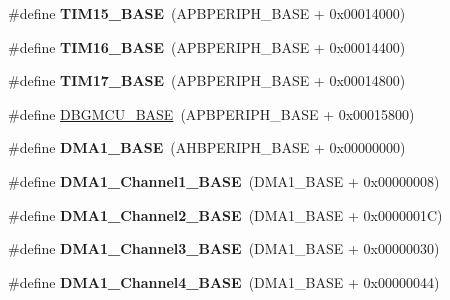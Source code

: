 \begin{DoxyCompactItemize}
\#define {\bfseries T\+I\+M15\+\_\+\+B\+A\+SE}~(A\+P\+B\+P\+E\+R\+I\+P\+H\+\_\+\+B\+A\+SE + 0x00014000)
\item 
\mbox{\label{group___peripheral__memory__map_ga16c97093a531d763b0794c3e6d09e1bf}} 
\#define {\bfseries T\+I\+M16\+\_\+\+B\+A\+SE}~(A\+P\+B\+P\+E\+R\+I\+P\+H\+\_\+\+B\+A\+SE + 0x00014400)
\item 
\mbox{\label{group___peripheral__memory__map_gaffbedbe30e8c4cffdea326d6c1800574}} 
\#define {\bfseries T\+I\+M17\+\_\+\+B\+A\+SE}~(A\+P\+B\+P\+E\+R\+I\+P\+H\+\_\+\+B\+A\+SE + 0x00014800)
\item 
\#define \hyperlink{group___peripheral__memory__map_ga4adaf4fd82ccc3a538f1f27a70cdbbef}{D\+B\+G\+M\+C\+U\+\_\+\+B\+A\+SE}~(A\+P\+B\+P\+E\+R\+I\+P\+H\+\_\+\+B\+A\+SE + 0x00015800)
\item 
\mbox{\label{group___peripheral__memory__map_gab2d8a917a0e4ea99a22ac6ebf279bc72}} 
\#define {\bfseries D\+M\+A1\+\_\+\+B\+A\+SE}~(A\+H\+B\+P\+E\+R\+I\+P\+H\+\_\+\+B\+A\+SE + 0x00000000)
\item 
\mbox{\label{group___peripheral__memory__map_ga888dbc1608243badeb3554ffedc7364c}} 
\#define {\bfseries D\+M\+A1\+\_\+\+Channel1\+\_\+\+B\+A\+SE}~(D\+M\+A1\+\_\+\+B\+A\+SE + 0x00000008)
\item 
\mbox{\label{group___peripheral__memory__map_ga38a70090eef3687e83fa6ac0c6d22267}} 
\#define {\bfseries D\+M\+A1\+\_\+\+Channel2\+\_\+\+B\+A\+SE}~(D\+M\+A1\+\_\+\+B\+A\+SE + 0x0000001\+C)
\item 
\mbox{\label{group___peripheral__memory__map_ga70b3d9f36ca9ce95b4e421c11154fe5d}} 
\#define {\bfseries D\+M\+A1\+\_\+\+Channel3\+\_\+\+B\+A\+SE}~(D\+M\+A1\+\_\+\+B\+A\+SE + 0x00000030)
\item 
\mbox{\label{group___peripheral__memory__map_ga1adc93cd0baf0897202c71110e045692}} 
\#define {\bfseries D\+M\+A1\+\_\+\+Channel4\+\_\+\+B\+A\+SE}~(D\+M\+A1\+\_\+\+B\+A\+SE + 0x00000044)
\item 
\mbox{\label{group___peripheral__memory__map_gac041a71cd6c1973964f847a68aa14478}} 

\end{DoxyCompactItemize}
